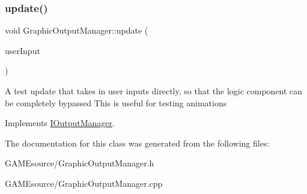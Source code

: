\subsubsection{\texorpdfstring{update()}{update()}\hspace{0.1cm}{\footnotesize\ttfamily [2/2]}}
{\footnotesize\ttfamily void Graphic\+Output\+Manager\+::update (\begin{DoxyParamCaption}\item[{User\+Input\+Type}]{user\+Input }\end{DoxyParamCaption})\hspace{0.3cm}{\ttfamily [virtual]}}

A test update that takes in user inputs directly, so that the logic component can be completely bypassed This is useful for testing animations 

Implements \mbox{\hyperlink{class_i_output_manager_aef1aaf499f3eee5927cb2833af39ce43}{I\+Output\+Manager}}.



The documentation for this class was generated from the following files\+:\begin{DoxyCompactItemize}
\item 
G\+A\+M\+Esource/Graphic\+Output\+Manager.\+h\item 
G\+A\+M\+Esource/Graphic\+Output\+Manager.\+cpp\end{DoxyCompactItemize}
